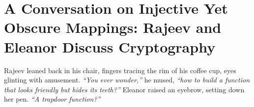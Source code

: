 % 
% 
% 
% 
\section*{A Conversation on Injective Yet Obscure Mappings: \newline Rajeev and Eleanor Discuss Cryptography}

Rajeev leaned back in his chair, fingers tracing the rim of his coffee cup, eyes glinting with amusement. \textit{“You ever wonder,”} he mused, \textit{“how to build a function that looks friendly but hides its teeth?”}
\bigskip
Eleanor raised an eyebrow, setting down her pen. \textit{“A trapdoor function?”}


